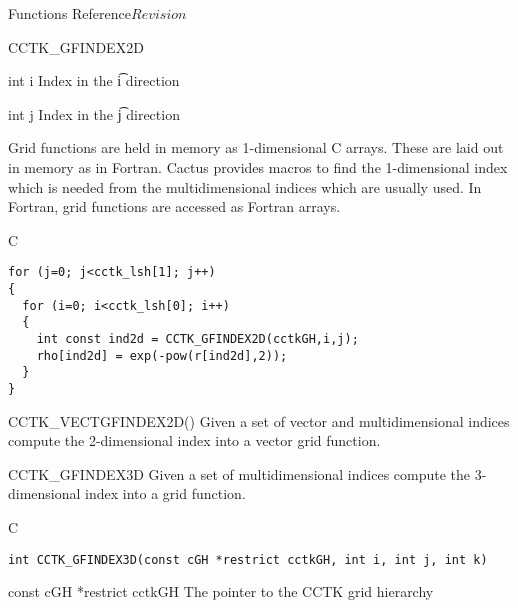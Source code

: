 \begin{cactuspart}{ Functions Reference}{}{$Revision$}
\begin{FunctionDescription}{CCTK\_GFINDEX2D}
\begin{ParameterSection}
\begin{Parameter} {int i}
Index in the \t{i} direction
\end{Parameter}

\begin{Parameter} {int j}
Index in the \t{j} direction
\end{Parameter}
\end{ParameterSection}

\begin{Discussion}
Grid functions are held in memory as 1-dimensional C arrays. These are
laid out in memory as in Fortran. Cactus provides macros to find the
1-dimensional index which is needed from the multidimensional indices which
are usually used. In Fortran, grid functions are accessed as Fortran arrays.
\end{Discussion}
\begin{ExampleSection}
\begin{Example}{C}
\begin{verbatim}
for (j=0; j<cctk_lsh[1]; j++)
{
  for (i=0; i<cctk_lsh[0]; i++)
  {
    int const ind2d = CCTK_GFINDEX2D(cctkGH,i,j);
    rho[ind2d] = exp(-pow(r[ind2d],2));
  }
}
\end{verbatim}
\end{Example}
\end{ExampleSection}
\begin{SeeAlsoSection}
\begin{SeeAlso}{CCTK\_VECTGFINDEX2D()}
Given a set of vector and multidimensional indices compute the 2-dimensional
index into a vector grid function.
\end{SeeAlso}

\end{SeeAlsoSection}
\end{FunctionDescription}



\begin{FunctionDescription}{CCTK\_GFINDEX3D}
\label{CCTK-GFINDEX3D}
Given a set of multidimensional indices compute the 3-dimensional index into a
grid function.
\begin{SynopsisSection}
\begin{Synopsis}{C}
\begin{verbatim}
int CCTK_GFINDEX3D(const cGH *restrict cctkGH, int i, int j, int k)
\end{verbatim}
\end{Synopsis}
\end{SynopsisSection}

\begin{ParameterSection}
\begin{Parameter} {const cGH *restrict cctkGH}
The pointer to the CCTK grid hierarchy
\end{Parameter}


\end{ParameterSection}
\end{FunctionDescription}
\end{cactuspart}
